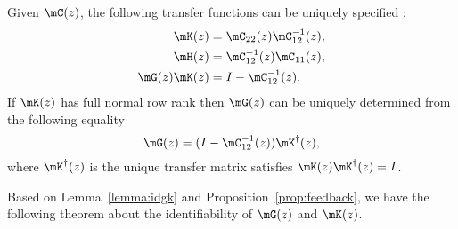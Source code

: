   \begin{proposition}\label{prop:feedback}
    Given $\mC(z)$, the following transfer functions can be uniquely specified :
    \begin{equation}\label{eq:khg}
      \begin{aligned}
	\mK(z)&=\mC_{22}(z)\mC^{-1}_{12}(z),\\
	\mH(z)&= \mC^{-1}_{12}(z)\mC_{11}(z),\\
	\mG(z)\mK(z)&=I-\mC^{-1}_{12}(z).
      \end{aligned}
    \end{equation}
    If $\mK(z)$ has full normal row rank then $\mG(z)$ can be uniquely determined from the following equality
    \begin{equation}
      \mG(z)=(I-\mC^{-1}_{12}(z))\mK^{\dagger}(z),
    \end{equation}  
    where $\mK^{\dagger}(z)$ is the unique transfer matrix satisfies $\mK(z)\mK^{\dagger}(z)=I$.
  \end{proposition}



  Based on Lemma~\ref{lemma:idgk} and Proposition~\ref{prop:feedback}, we have the following theorem about the identifiability of $\mG(z)$ and $\mK(z)$.

